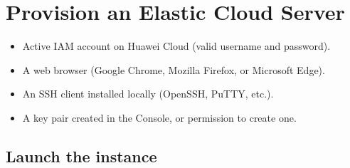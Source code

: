 \documentclass[english]{labguide}
\begin{document}
\makecover

\sumario

\startbody

\section{Provision an Elastic Cloud Server}

\begin{objetivos}

  \prerequisitos
  \begin{itemize}
    \item Active IAM account on Huawei Cloud (valid username and password).
    \item A web browser (Google Chrome, Mozilla Firefox, or Microsoft Edge).
    \item An SSH client installed locally (OpenSSH, PuTTY, etc.).
    \item A key pair created in the Console, or permission to create one.
  \end{itemize}
\end{objetivos}

\subsection{Launch the instance}

\end{document}
